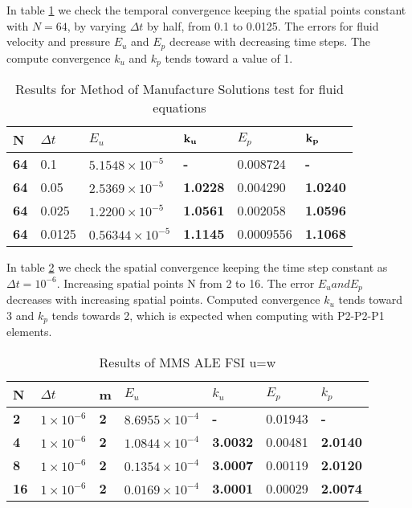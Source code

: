 In table \ref{tab:MMS_Flu?id_time} we check the temporal convergence keeping the spatial points constant with $N=64$, by varying $\Delta t$ by half, from 0.1 to 0.0125. The errors for fluid velocity and pressure $E_u$ and $E_p$ decrease with decreasing time steps. The compute convergence $k_u$ and $k_p$ tends toward a value of 1.

\begin{table}[H]
\centering
\caption{Results for Method of Manufacture Solutions test for fluid equations}
\label{tab:MMS_Flu?id_time}
\begin{tabular}{|l|l|l|l|l|l|}
\hline
\textbf{N} & $\Delta t$ & $E_u$ & $\bold{k_u}$ & $E_p$ & $\bold{k_p}$ \\ \hline
\textbf{64} & 0.1 & $5.1548 \times 10^{-5}$ & \textbf{-} & 0.008724 & \textbf{-} \\ \hline
\textbf{64} & 0.05 & $2.5369 \times 10^{-5}$ & \textbf{1.0228} & 0.004290 & \textbf{1.0240} \\ \hline
\textbf{64} & 0.025 & $1.2200 \times 10^{-5}$ & \textbf{1.0561} & 0.002058 & \textbf{1.0596} \\ \hline
\textbf{64} & 0.0125 & $0.56344 \times 10^{-5}$ & \textbf{1.1145} & 0.0009556 & \textbf{1.1068} \\ \hline
\end{tabular}
\end{table}

In table \ref{tab:MMS_Fluid_space} we check the spatial convergence keeping the time step constant as $\Delta t=10^{-6}$. Increasing spatial points N from 2 to 16. The error $E_u and E_p$ decreases with increasing spatial points. Computed convergence $k_u$ tends toward 3 and $k_p$ tends towards 2, which is expected when computing with P2-P2-P1 elements.

\begin{table}[H]
\centering
\caption{Results of MMS ALE FSI u=w}
\label{tab:MMS_Fluid_space}
\begin{tabular}{|l|l|l|l|l|l|l|}
\hline
\textbf{N}  & $\Delta t$ & \textbf{m} & $E_u$                   & \textbf{$k_u$}  & $E_p$   & \textbf{$k_p$}  \\ \hline
\textbf{2}  & $1 \times 10^{-6}$ & \textbf{2} & $8.6955 \times 10^{-4}$ & \textbf{-}      & 0.01943 & \textbf{-}      \\ \hline
\textbf{4}  & $1 \times 10^{-6}$ & \textbf{2} & $1.0844 \times 10^{-4}$ & \textbf{3.0032} & 0.00481 & \textbf{2.0140} \\ \hline
\textbf{8}  & $1 \times 10^{-6}$ & \textbf{2} & $0.1354 \times 10^{-4}$ & \textbf{3.0007} & 0.00119 & \textbf{2.0120} \\ \hline
\textbf{16} & $1 \times 10^{-6}$ & \textbf{2} & $0.0169 \times 10^{-4}$ & \textbf{3.0001} & 0.00029 & \textbf{2.0074} \\ \hline
\end{tabular}
\end{table}

